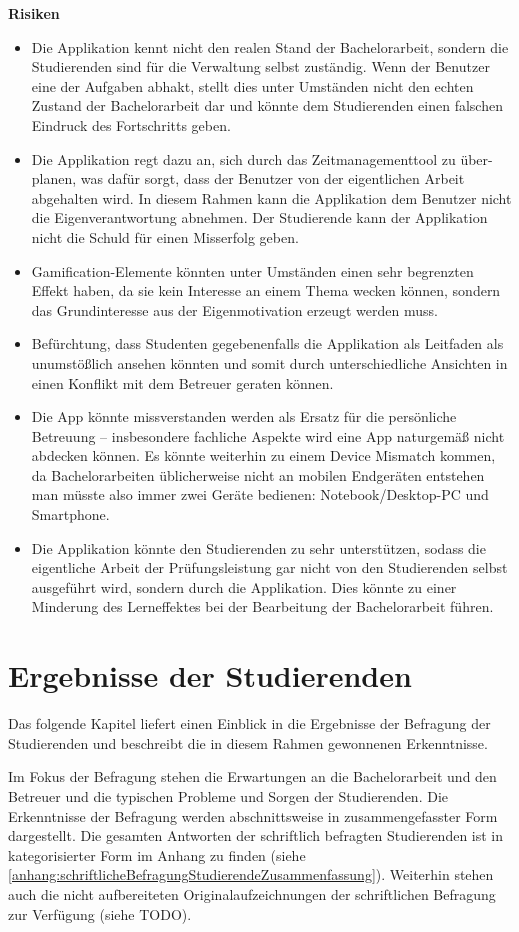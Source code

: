 \documentclass[bibliography=totoc,listof=totoc,BCOR=5mm,DIV=12,oneside]{scrbook}
\begin{document}
\newpage
\par \bigskip \textbf{Risiken}
\begin{itemize}
\item Die Applikation kennt nicht den realen Stand der Bachelorarbeit, sondern die Studierenden sind für die Verwaltung selbst zuständig. Wenn der Benutzer eine der Aufgaben abhakt, stellt dies unter Umständen nicht den echten Zustand der Bachelorarbeit dar und könnte dem Studierenden einen falschen Eindruck des Fortschritts geben.
\item Die Applikation regt dazu an, sich durch das Zeitmanagementtool zu über-planen, was dafür sorgt, dass der Benutzer von der eigentlichen Arbeit abgehalten wird. In diesem Rahmen kann die Applikation dem Benutzer nicht die Eigenverantwortung abnehmen. Der Studierende kann der Applikation nicht die Schuld für einen Misserfolg geben.
\item Gamification-Elemente könnten unter Umständen einen sehr begrenzten Effekt haben, da sie kein Interesse an einem Thema wecken können, sondern das Grundinteresse aus der Eigenmotivation erzeugt werden muss.
\item Befürchtung, dass Studenten gegebenenfalls die Applikation als Leitfaden als unumstößlich ansehen könnten und somit durch unterschiedliche Ansichten in einen Konflikt mit dem Betreuer geraten können.
\item Die App könnte missverstanden werden als Ersatz für die persönliche Betreuung – insbesondere fachliche Aspekte wird eine App naturgemäß nicht abdecken können. Es könnte weiterhin zu einem \grqq Device Mismatch\grqq{} kommen, da Bachelorarbeiten üblicherweise nicht an mobilen Endgeräten entstehen man müsste also immer zwei Geräte bedienen: Notebook/Desktop-PC und Smartphone.
\item Die Applikation könnte den Studierenden zu sehr unterstützen, sodass die eigentliche Arbeit der Prüfungsleistung gar nicht von den Studierenden selbst ausgeführt wird, sondern durch die Applikation. Dies könnte zu einer Minderung des Lerneffektes bei der Bearbeitung der Bachelorarbeit führen.

\end{itemize}

\newpage
\section{Ergebnisse der Studierenden}
\par Das folgende Kapitel liefert einen Einblick in die Ergebnisse der Befragung der Studierenden und beschreibt die in diesem Rahmen gewonnenen Erkenntnisse.
\par Im Fokus der Befragung stehen die Erwartungen an die Bachelorarbeit und den Betreuer und die typischen Probleme und Sorgen der Studierenden. Die Erkenntnisse der Befragung werden abschnittsweise in zusammengefasster Form dargestellt. Die gesamten Antworten der schriftlich befragten Studierenden ist in kategorisierter Form im Anhang zu finden (siehe \ref{anhang:schriftlicheBefragungStudierendeZusammenfassung}). Weiterhin stehen auch die nicht aufbereiteten Originalaufzeichnungen der schriftlichen Befragung zur Verfügung (siehe TODO).
\end{document}
